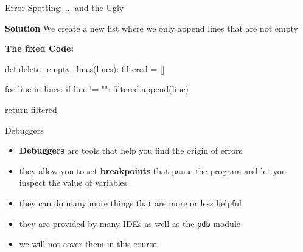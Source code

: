 \begin{frame}[fragile]{Error Spotting: ... and the Ugly}

    \begin{block}{\textbf{Solution}}
        We create a new list where we only append lines that are not empty
    \end{block}

    \textbf{The fixed Code:}

    \begin{pythoncode}
    def delete_empty_lines(lines):
        filtered = []

        for line in lines:
            if line != "":
                filtered.append(line)

        return filtered
    \end{pythoncode}


\end{frame}

\begin{frame}{Debuggers}
    \begin{itemize}
        \item \textbf{Debuggers} are tools that help you find the origin of errors
        \item they allow you to set \textbf{breakpoints} that pause the program and let you inspect the value of variables
        \item they can do many more things that are more or less helpful
        \item they are provided by many IDEs as well as the \texttt{pdb} module
        \item we will not cover them in this course
    \end{itemize}

\end{frame}


